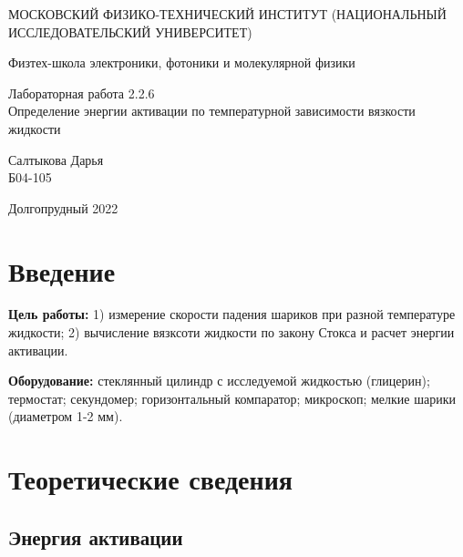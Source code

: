 \documentclass[a4paper,12pt]{article} %
\begin{document}
	
	\begin{titlepage}
	\begin{center}
		{\large МОСКОВСКИЙ ФИЗИКО-ТЕХНИЧЕСКИЙ ИНСТИТУТ (НАЦИОНАЛЬНЫЙ ИССЛЕДОВАТЕЛЬСКИЙ УНИВЕРСИТЕТ)}
	\end{center}
	\begin{center}
		{\large Физтех-школа электроники, фотоники и молекулярной физики}
	\end{center}
	
	
	\vspace{4.5cm}
	{\huge
		\begin{center}
			{Лабораторная работа 2.2.6}\\
			Определение энергии активации по температурной зависимости вязкости жидкости
		\end{center}
	}
	\vspace{2cm}
	\begin{flushright}
		{\LARGE Салтыкова Дарья \\
			\vspace{0.5cm}
			Б04-105}
	\end{flushright}
	\vspace{8cm}
	\begin{center}
		Долгопрудный 2022
	\end{center}
\end{titlepage}

\section{Введение}

\textbf{Цель работы:} 1) измерение скорости падения шариков при разной температуре жидкости; 2) вычисление вязксоти жидкости по закону Стокса и расчет энергии активации. 

\medskip

\noindent \textbf{Оборудование:} стеклянный цилиндр с исследуемой жидкостью (глицерин); термостат; секундомер; горизонтальный компаратор; микроскоп; мелкие шарики (диаметром 1-2 мм).

\section{Теоретические сведения}

\subsection{Энергия активации}
	
\end{document}
